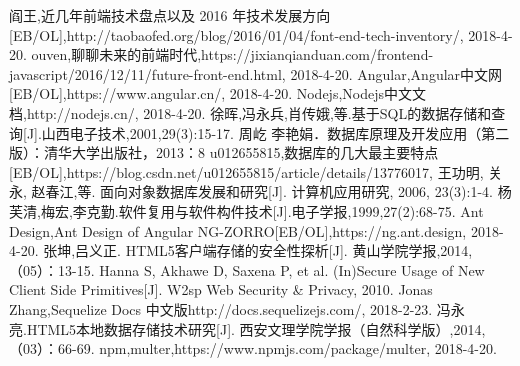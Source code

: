 \begin{thebibliography}{123456}
	阎王,近几年前端技术盘点以及 2016 年技术发展方向[EB/OL],http://taobaofed.org/blog/2016/01/04/font-end-tech-inventory/, 2018-4-20.
	ouven,聊聊未来的前端时代,https://jixianqianduan.com/frontend-javascript/2016/12/11/future-front-end.html, 2018-4-20.
	Angular,Angular中文网[EB/OL],https://www.angular.cn/, 2018-4-20.
	Nodejs,Nodejs中文文档,http://nodejs.cn/, 2018-4-20.
	徐晖,冯永兵,肖传娥,等.基于SQL的数据存储和查询[J].山西电子技术,2001,29(3):15-17.
	周屹 李艳娟．数据库原理及开发应用（第二版）：清华大学出版社，2013：8
	u012655815,数据库的几大最主要特点[EB/OL],https://blog.csdn.net/u012655815/article/details/13776017, 
	王功明, 关永, 赵春江,等. 面向对象数据库发展和研究[J]. 计算机应用研究, 2006, 23(3):1-4.
	杨芙清,梅宏,李克勤.软件复用与软件构件技术[J].电子学报,1999,27(2):68-75.
	Ant Design,Ant Design of Angular NG-ZORRO[EB/OL],https://ng.ant.design, 2018-4-20.
	 张坤,吕义正. HTML5客户端存储的安全性探析[J]. 黄山学院学报,2014,（05）：13-15.
	Hanna S, Akhawe D, Saxena P, et al. (In)Secure Usage of New Client Side Primitives[J]. W2sp Web Security \& Privacy, 2010.
	Jonas Zhang,Sequelize Docs 中文版http://docs.sequelizejs.com/, 2018-2-23.	
	冯永亮.HTML5本地数据存储技术研究[J]. 西安文理学院学报（自然科学版）,2014,（03）：66-69.
	npm,multer,https://www.npmjs.com/package/multer, 2018-4-20.
\end{thebibliography}